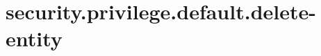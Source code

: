 \section{security.privilege.default.delete-entity}
\label{configuration:SecurityPrivilegeDefaultDeleteEntity}
\AvailableInJavaOnly{\TODO}